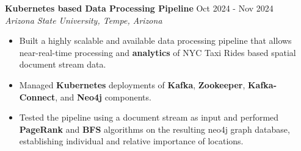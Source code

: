 \documentclass[a4paper,9pt]{extarticle}
\begin{document}
\noindent
\textbf{Kubernetes based Data Processing Pipeline}  \hfill Oct 2024 - Nov 2024\\ %
\textit{Arizona State University, Tempe, Arizona} %
\begin{itemize}
    \item Built a highly scalable and available data processing pipeline that allows near-real-time processing and \textbf{analytics} of NYC Taxi Rides based spatial document stream data.
    \item Managed \textbf{Kubernetes} deployments of \textbf{Kafka}, \textbf{Zookeeper}, \textbf{Kafka-Connect}, and \textbf{Neo4j} components.
    \item Tested the pipeline using a document stream as input and performed \textbf{PageRank} and \textbf{BFS} algorithms on the resulting neo4j graph database, establishing individual and relative importance of locations. 
    
\end{itemize}


\end{document}
